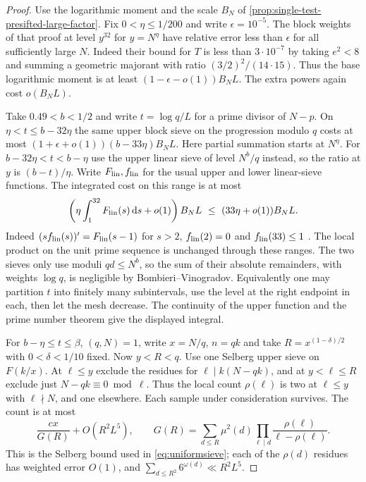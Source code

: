 \documentclass[11pt,a4paper]{article}
\numberwithin{equation}{section}
\newcommand{\ud}{\mathrm d}
\begin{document}
\begin{proof}
Use the logarithmic moment and the scale $B_N$ of
\cref{prop:single-test-presifted-large-factor}. Fix $0<\eta\le1/200$
and write $\epsilon=10^{-5}$. The block weights of that proof
at level $y^{32}$ for $y=N^\eta$ have relative error less than
$\epsilon$ for all sufficiently large $N$. Indeed their bound
for $T$ is less than $3\cdot10^{-7}$ by taking $e^2<8$ and
summing a geometric majorant with ratio $(3/2)^2/(14\cdot15)$.
Thus the base logarithmic moment is at least
$(1-\epsilon-o(1))B_N L$. The extra powers again cost $o(B_NL)$.

Take $0.49<b<1/2$ and write $t=\log q/L$ for a prime divisor
of $N-p$. On $\eta<t\le b-32\eta$ the same upper block sieve
on the progression modulo $q$ costs at most
$(1+\epsilon+o(1))(b-33\eta)B_NL$. Here partial summation starts
at $N^\eta$. For $b-32\eta<t<b-\eta$ use the upper linear sieve
of level $N^b/q$ instead, so the ratio at $y$ is $(b-t)/\eta$.
Write $F_{\rm lin},f_{\rm lin}$ for the usual upper and lower
linear-sieve functions. The integrated cost on this range is at
most
\[
 \left(\eta\int_1^{32}F_{\rm lin}(s)\,\ud s+o(1)\right)B_N L
 \ \le\ (33\eta+o(1))B_N L.
\]
Indeed $(s f_{\rm lin}(s))'=F_{\rm lin}(s-1)$ for $s>2$,
$f_{\rm lin}(2)=0$ and $f_{\rm lin}(33)\le1$
\cite[Chapter~11]{OperaCribro}.
The local product on the unit prime sequence is unchanged
through these ranges. The two sieves only use moduli $qd\le N^b$,
so the sum of their absolute remainders, with weights $\log q$,
is negligible by Bombieri--Vinogradov. Equivalently one may
partition $t$ into finitely many subintervals, use the level at
the right endpoint in each, then let the mesh decrease. The
continuity of the upper function and the prime number theorem
give the displayed integral.

For $b-\eta\le t\le\beta$, $(q,N)=1$, write $x=N/q$, $n=qk$
and take $R=x^{(1-\delta)/2}$ with $0<\delta<1/10$ fixed.
Now $y<R<q$. Use one Selberg upper sieve on $F(k/x)$.
At $\ell\le y$ exclude the residues for $\ell\mid k(N-qk)$,
and at $y<\ell\le R$ exclude just $N-qk\equiv0\bmod\ell$.
Thus the local count $\rho(\ell)$ is two at $\ell\le y$
with $\ell\nmid N$, and one elsewhere. Each sample under
consideration survives. The count is at most
\[
 \frac{cx}{G(R)}+O(R^2 L^5),\qquad
 G(R)=\sum_{d\le R}\mu^2(d)\prod_{\ell\mid d}
                \frac{\rho(\ell)}{\ell-\rho(\ell)} .
\]
This is the Selberg bound used in \eqref{eq:uniformsieve};
each of the $\rho(d)$ residues has weighted error $O(1)$,
and $\sum_{d\le R^2}6^{\omega(d)}\ll R^2 L^5$.


\end{proof}
\end{document}
